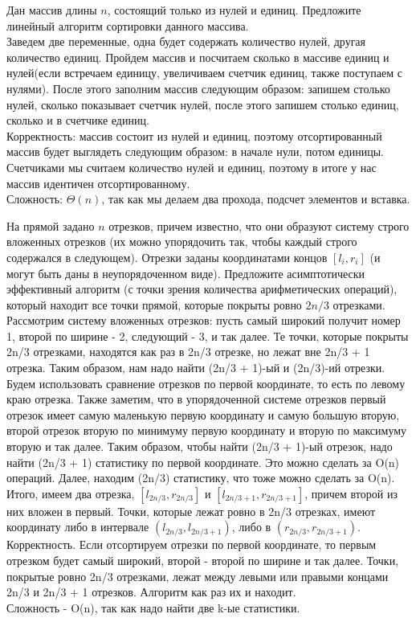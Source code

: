 \documentclass[12pt]{extreport}
\theoremstyle{definiton}
\theoremstyle{definition}
\theoremstyle{definition}
\begin{document}
	

\Pr[2] Дан массив длины $n$, состоящий только из нулей и единиц. Предложите линейный алгоритм сортировки данного массива.
\newline 
\\ Заведем две переменные, одна будет содержать количество нулей, другая количество единиц. Пройдем массив и посчитаем сколько в массиве единиц и нулей(если встречаем единицу, увеличиваем счетчик единиц, также поступаем с нулями). После этого заполним массив следующим образом: запишем столько нулей, сколько показывает счетчик нулей, после этого запишем столько единиц, сколько и в счетчике единиц. 
\\Корректность: массив состоит из нулей и единиц, поэтому отсортированный массив будет выглядеть следующим образом: в начале нули, потом единицы. Счетчиками мы считаем количество нулей и единиц, поэтому в итоге у нас массив идентичен отсортированному.
\\Сложность: $\Theta(n)$, так как мы делаем два прохода, подсчет элементов и вставка.

	\Pr[2] На прямой задано $n$ отрезков, причем известно, что они образуют систему строго вложенных отрезков (их можно упорядочить так, чтобы каждый строго содержался в следующем). Отрезки заданы координатами концов $[l_i, r_i]$ (и могут быть даны в неупорядоченном виде). Предложите асимптотически эффективный алгоритм (с точки зрения количества арифметических операций), который находит все точки прямой, которые покрыты ровно $2n/3$ отрезками.
    \newline
    \\ Рассмотрим систему вложенных отрезков: пусть самый широкий получит номер 1, второй по ширине - 2, следующий - 3, и так далее. Те точки, которые покрыты 2n/3 отрезками, находятся как раз в 2n/3 отрезке, но лежат вне 2n/3 + 1 отрезка. Таким образом, нам надо найти (2n/3 + 1)-ый и (2n/3)-ий отрезки. Будем использовать сравнение отрезков по первой координате, то есть по левому краю отрезка. Также заметим, что в упорядоченной системе отрезков первый отрезок имеет самую маленькую первую координату и самую большую вторую, второй отрезок вторую по минимуму первую координату и вторую по максимуму вторую и так далее. Таким образом, чтобы найти (2n/3 + 1)-ый отрезок, надо найти (2n/3 + 1) статистику по первой координате. Это можно сделать за O(n) операций. Далее, находим (2n/3) статистику, что тоже можно сделать за O(n). Итого, имеем два отрезка, $[l_{2n/3},r_{2n/3}]$ и $[l_{2n/3 + 1}, r_{2n/3 + 1}]$, причем второй из них вложен в первый. Точки, которые лежат ровно в 2n/3 отрезках, имеют координату либо в интервале $(l_{2n/3}, l_{2n/3 + 1})$, либо в $(r_{2n/3}, r_{2n/3 + 1})$. 
    \\ Корректность. Если отсортируем отрезки по первой координате, то первым отрезком будет самый широкий, второй - второй по ширине и так далее. Точки, покрытые ровно 2n/3 отрезками, лежат между левыми или правыми концами 2n/3 и 2n/3 + 1 отрезков. Алгоритм как раз их и находит.
    \\ Сложность - O(n), так как надо найти две k-ые статистики.
\end{document}
